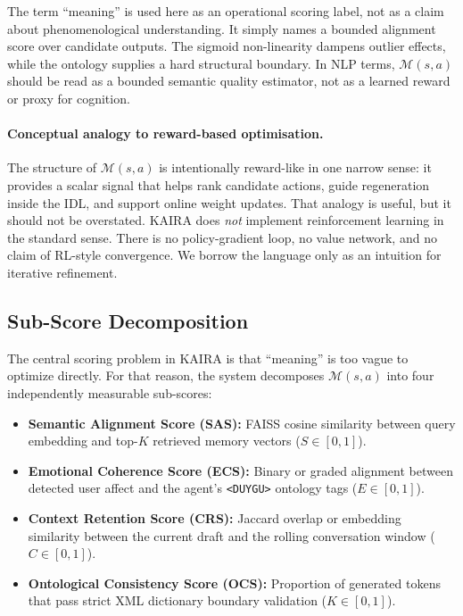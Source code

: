 \documentclass[11pt,a4paper]{article}
\begin{document}
The term ``meaning'' is used here as an operational scoring label, not as a claim about phenomenological understanding. It simply names a bounded alignment score over candidate outputs. The sigmoid non-linearity dampens outlier effects, while the ontology supplies a hard structural boundary. In NLP terms, $\mathcal{M}(s,a)$ should be read as a bounded semantic quality estimator, not as a learned reward or proxy for cognition.

\paragraph{Conceptual analogy to reward-based optimisation.}
The structure of $\mathcal{M}(s,a)$ is intentionally reward-like in one narrow sense: it provides a scalar signal that helps rank candidate actions, guide regeneration inside the IDL, and support online weight updates. That analogy is useful, but it should not be overstated. KAIRA does \textit{not} implement reinforcement learning in the standard sense. There is no policy-gradient loop, no value network, and no claim of RL-style convergence. We borrow the language only as an intuition for iterative refinement.

\subsection{Sub-Score Decomposition}

The central scoring problem in KAIRA is that ``meaning'' is too vague to optimize directly. For that reason, the system decomposes $\mathcal{M}(s,a)$ into four independently measurable sub-scores:

\begin{itemize}
  \item \textbf{Semantic Alignment Score (SAS):} FAISS cosine similarity between query embedding and top-$K$ retrieved memory vectors ($S \in [0,1]$).
  \item \textbf{Emotional Coherence Score (ECS):} Binary or graded alignment between detected user affect and the agent's \texttt{<DUYGU>} ontology tags ($E \in [0,1]$).
  \item \textbf{Context Retention Score (CRS):} Jaccard overlap or embedding similarity between the current draft and the rolling conversation window ($C \in [0,1]$).
  \item \textbf{Ontological Consistency Score (OCS):} Proportion of generated tokens that pass strict XML dictionary boundary validation ($K \in [0,1]$).
\end{itemize}
\end{document}
